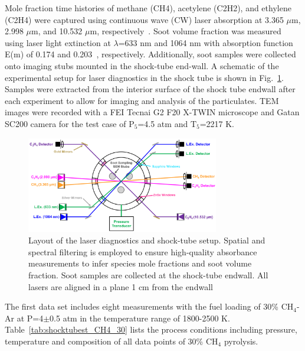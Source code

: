 Mole fraction time histories of methane (CH4), acetylene (C2H2), and ethylene (C2H4) were captured using continuous wave (CW) laser absorption at 3.365 $\mu$m, 2.998 $\mu$m, and 10.532 $\mu$m, respectively~\citep{pinkowski2019multi, cassady2020thermal, stranic2014laser}. Soot volume fraction was measured using laser light extinction at $\lambda$=633 nm and 1064 nm with absorption function E(m) of 0.174 and 0.203~\citep{lee1981optical}, respectively. Additionally, soot samples were collected onto imaging stubs mounted in the shock-tube end-wall. A schematic of the experimental setup for laser diagnostics in the shock tube is shown in Fig.~\ref{fig:shocktubelaserlayout}. Samples were extracted from the interior surface of the shock tube endwall after each experiment to allow for imaging and analysis of the particulates. TEM images were recorded with a FEI Tecnai G2 F20 X-TWIN microscope and Gatan SC200 camera for the test case of $\mathrm{P_5}$=4.5 atm and $\mathrm{T_5}$=2217 K.

\begin{figure}[H]
	\centering
	\includegraphics[width=0.75\textwidth]{Figures/Results/Shocktube/laserdiagnostics.pdf}
	\caption{Layout of the laser diagnostics and shock-tube setup. Spatial and spectral filtering is employed to ensure high-quality absorbance measurements to infer species mole fractions and soot volume fraction. Soot samples are collected at the shock-tube endwall. All lasers are aligned in a plane 1 cm from the endwall}
	\label{fig:shocktubelaserlayout} 
\end{figure}

The first data set includes eight measurements with the fuel loading of 30\% $\mathrm{CH_4}$-Ar at P=4$\pm$0.5 atm in the temperature range of 1800-2500 K. Table~\ref{tab:shocktubest_CH4_30} lists the process conditions including pressure, temperature and composition of all data points of 30\% $\mathrm{CH_4}$ pyrolysis.


